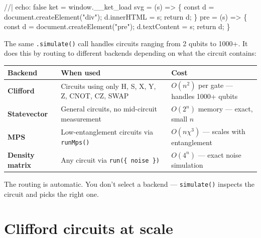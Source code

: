 \documentclass[
  11pt,
  letterpaper,
  oneside]{scrbook}
\newenvironment{Shaded}{\begin{snugshade}}{\end{snugshade}}
\newcommand{\NormalTok}[1]{\textcolor[rgb]{0.00,0.23,0.31}{#1}}
\begin{document}
\begin{Shaded}
\begin{Highlighting}[]
\NormalTok{//| echo: false}
\NormalTok{ket = window.\_\_ket\_load}
\NormalTok{svg = (s) =\textgreater{} \{ const d = document.createElement("div"); d.innerHTML = s; return d; \}}
\NormalTok{pre = (s) =\textgreater{} \{ const d = document.createElement("pre"); d.textContent = s; return d; \}}
\end{Highlighting}
\end{Shaded}

The same \texttt{.simulate()} call handles circuits ranging from 2
qubits to 1000+. It does this by routing to different backends depending
on what the circuit contains:

\begin{longtable}[]{@{}
  >{\raggedright\arraybackslash}p{}
  >{\raggedright\arraybackslash}p{}
  >{\raggedright\arraybackslash}p{}@{}}
\toprule\noalign{}
\begin{minipage}[b]{\linewidth}\raggedright
Backend
\end{minipage} & \begin{minipage}[b]{\linewidth}\raggedright
When used
\end{minipage} & \begin{minipage}[b]{\linewidth}\raggedright
Cost
\end{minipage} \\
\midrule\noalign{}
\endhead
\bottomrule\noalign{}
\endlastfoot
\textbf{Clifford} & Circuits using only H, S, X, Y, Z, CNOT, CZ, SWAP &
\(O(n^2)\) per gate --- handles 1000+ qubits \\
\textbf{Statevector} & General circuits, no mid-circuit measurement &
\(O(2^n)\) memory --- exact, small \(n\) \\
\textbf{MPS} & Low-entanglement circuits via \texttt{runMps()} &
\(O(n \chi^3)\) --- scales with entanglement \\
\textbf{Density matrix} & Any circuit via \texttt{run(\{\ noise\ \})} &
\(O(4^n)\) --- exact noise simulation \\
\end{longtable}

The routing is automatic. You don't select a backend ---
\texttt{simulate()} inspects the circuit and picks the right one.

\section{Clifford circuits at scale}\label{clifford-circuits-at-scale}
\end{document}
